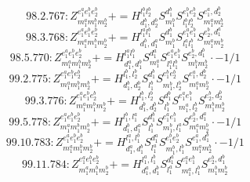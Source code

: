 \documentclass[letterpaper,10pt,fleqn,leqno,onecolumn]{article}
\begin{document}
\begin{equation} \;\;\;\;\;\;  98.2.767: Z^{e_{1}^{a}e_{1}^{b}e_{2}^{b}}_{m_{1}^{a}m_{1}^{b}m_{2}^{b}}+=H^{l_{1}^{b}l_{2}^{b}}_{d_{1}^{b},d_{2}^{b}}S^{d_{1}^{b}}_{m_{1}^{b}}S^{e_{1}^{b}e_{2}^{b}}_{l_{1}^{b}l_{2}^{b}}S^{e_{1}^{a},d_{2}^{b}}_{m_{1}^{a}m_{2}^{b}} \end{equation}
\begin{equation} \;\;\;\;\;\;  98.3.768: Z^{e_{1}^{a}e_{1}^{b}e_{2}^{b}}_{m_{1}^{a}m_{1}^{b}m_{2}^{b}}+=H^{l_{1}^{a}l_{1}^{b}}_{d_{1}^{b},d_{1}^{a}}S^{d_{1}^{b}}_{m_{1}^{b}}S^{e_{1}^{a}e_{1}^{b}}_{l_{1}^{a}l_{1}^{b}}S^{e_{2}^{b},d_{1}^{a}}_{m_{1}^{a}m_{2}^{b}} \end{equation}
\begin{equation} \;\;\;\;\;\;  98.5.770: Z^{e_{1}^{a}e_{1}^{b}e_{2}^{b}}_{m_{1}^{a}m_{1}^{b}m_{2}^{b}}+=H^{l_{1}^{a}l_{1}^{b}}_{d_{1}^{a},d_{1}^{b}}S^{d_{1}^{a}}_{m_{1}^{a}}S^{e_{1}^{a}e_{1}^{b}}_{l_{1}^{a}l_{1}^{b}}S^{e_{2}^{b},d_{1}^{b}}_{m_{1}^{b}m_{2}^{b}}\cdot -1/1 \end{equation}
\begin{equation} \;\;\;\;\;\;  99.2.775: Z^{e_{1}^{a}e_{1}^{b}e_{2}^{b}}_{m_{1}^{a}m_{1}^{b}m_{2}^{b}}+=H^{l_{1}^{b},l_{2}^{b}}_{d_{1}^{b},d_{2}^{b}}S^{d_{1}^{b}}_{l_{1}^{b}}S^{e_{1}^{b}e_{2}^{b}}_{m_{1}^{b},l_{2}^{b}}S^{e_{1}^{a},d_{2}^{b}}_{m_{1}^{a}m_{2}^{b}}\cdot -1/1 \end{equation}
\begin{equation} \;\;\;\;\;\;  99.3.776: Z^{e_{1}^{a}e_{1}^{b}e_{2}^{b}}_{m_{1}^{a}m_{1}^{b}m_{2}^{b}}+=H^{l_{1}^{b},l_{2}^{b}}_{d_{1}^{b},d_{2}^{b}}S^{d_{1}^{b}}_{l_{1}^{b}}S^{e_{1}^{a}e_{1}^{b}}_{m_{1}^{a},l_{2}^{b}}S^{e_{2}^{b},d_{2}^{b}}_{m_{1}^{b}m_{2}^{b}} \end{equation}
\begin{equation} \;\;\;\;\;\;  99.5.778: Z^{e_{1}^{a}e_{1}^{b}e_{2}^{b}}_{m_{1}^{a}m_{1}^{b}m_{2}^{b}}+=H^{l_{1}^{b},l_{1}^{a}}_{d_{1}^{b},d_{1}^{a}}S^{d_{1}^{b}}_{l_{1}^{b}}S^{e_{1}^{a}e_{1}^{b}}_{m_{1}^{b},l_{1}^{a}}S^{e_{2}^{b},d_{1}^{a}}_{m_{1}^{a}m_{2}^{b}}\cdot -1/1 \end{equation}
\begin{equation} \;\;\;\;\;\;  99.10.783: Z^{e_{1}^{a}e_{1}^{b}e_{2}^{b}}_{m_{1}^{a}m_{1}^{b}m_{2}^{b}}+=H^{l_{1}^{a},l_{1}^{b}}_{d_{1}^{a},d_{1}^{b}}S^{d_{1}^{a}}_{l_{1}^{a}}S^{e_{1}^{b}e_{2}^{b}}_{m_{1}^{b},l_{1}^{b}}S^{e_{1}^{a},d_{1}^{b}}_{m_{1}^{a}m_{2}^{b}}\cdot -1/1 \end{equation}
\begin{equation} \;\;\;\;\;\;  99.11.784: Z^{e_{1}^{a}e_{1}^{b}e_{2}^{b}}_{m_{1}^{a}m_{1}^{b}m_{2}^{b}}+=H^{l_{1}^{a},l_{1}^{b}}_{d_{1}^{a},d_{1}^{b}}S^{d_{1}^{a}}_{l_{1}^{a}}S^{e_{1}^{a}e_{1}^{b}}_{m_{1}^{a},l_{1}^{b}}S^{e_{2}^{b},d_{1}^{b}}_{m_{1}^{b}m_{2}^{b}} \end{equation}
\end{document}
